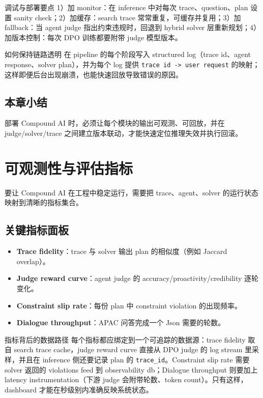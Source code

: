 \documentclass[a4paper]{article}
\begin{document}
\begin{importantbox}{调试与部署要点}
1）加 monitor：在 inference 中对每次 trace、question、plan 设置 sanity check；2）加缓存：search trace 常常重复，可缓存并复用；3）加 fallback：当 agent judge 指出约束违规时，回退到 hybrid solver 层重新规划；4）加版本控制：每次 DPO 训练都要附带 judge 模型版本。
\end{importantbox}

\begin{knowledgebox}{如何保持链路透明}
在 pipeline 的每个阶段写入 structured log（trace id、agent response、solver plan），并为每个 log 提供 \texttt{trace id -> user request} 的映射；这样即便后台出现崩溃，也能快速回放导致错误的原因。
\end{knowledgebox}

\subsection{本章小结}

部署 Compound AI 时，必须让每个模块的输出可观测、可回放，并在 judge/solver/trace 之间建立版本联动，才能快速定位推理失效并执行回滚。

\section{可观测性与评估指标}

要让 Compound AI 在工程中稳定运行，需要把 trace、agent、solver 的运行状态映射到清晰的指标集合。

\subsection{关键指标面板}

\begin{itemize}
    \item \textbf{Trace fidelity}：trace 与 solver 输出 plan 的相似度（例如 Jaccard overlap）。
    \item \textbf{Judge reward curve}：agent judge 的 accuracy/proactivity/credibility 逐轮变化。
    \item \textbf{Constraint slip rate}：每份 plan 中 constraint violation 的出现频率。
    \item \textbf{Dialogue throughput}：APAC 问答完成一个 Json 需要的轮数。
\end{itemize}

\begin{importantbox}{指标背后的数据路径}
每个指标都应绑定到一个可追踪的数据源：trace fidelity 取自 search trace cache，judge reward curve 直接从 DPO judge 的 log stream 里采样，并且在 inference 侧还要记录 plan 的 \texttt{trace\_id}。Constraint slip rate 需要 solver 返回的 violations feed 到 observability db；Dialogue throughput 则要加上 latency instrumentation（下游 judge 会附带轮数、token count）。只有这样，dashboard 才能在秒级别内准确反映系统状态。
\end{importantbox}
\end{document}
